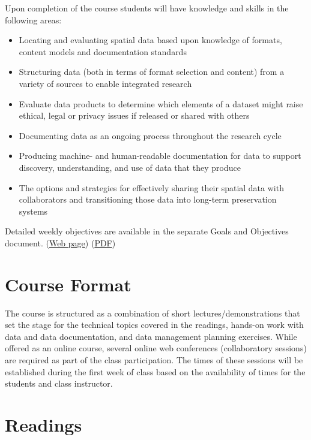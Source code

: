 \documentclass[
]{article}
\providecommand{\tightlist}{%
  \setlength{\itemsep}{0pt}\setlength{\parskip}{0pt}}
\begin{document}
Upon completion of the course students will have knowledge and skills in
the following areas:

\begin{itemize}
\tightlist
\item
  Locating and evaluating spatial data based upon knowledge of formats,
  content models and documentation standards
\item
  Structuring data (both in terms of format selection and content) from
  a variety of sources to enable integrated research
\item
  Evaluate data products to determine which elements of a dataset might
  raise ethical, legal or privacy issues if released or shared with
  others
\item
  Documenting data as an ongoing process throughout the research cycle
\item
  Producing machine- and human-readable documentation for data to
  support discovery, understanding, and use of data that they produce
\item
  The options and strategies for effectively sharing their spatial data
  with collaborators and transitioning those data into long-term
  preservation systems
\end{itemize}

Detailed weekly objectives are available in the separate Goals and
Objectives document.
(\href{http://karlbenedict.com/OILS515/goalsAndObjectives/goalsAndObjectives.html}{Web
page}) \textbar{}
(\href{http://karlbenedict.com/OILS515/goalsAndObjectives/goalsAndObjectives.pdf}{PDF})

\hypertarget{course-format}{%
\section{Course Format}\label{course-format}}

The course is structured as a combination of short
lectures/demonstrations that set the stage for the technical topics
covered in the readings, hands-on work with data and data documentation,
and data management planning exercises. While offered as an online
course, several online web conferences (collaboratory sessions) are
required as part of the class participation. The times of these sessions
will be established during the first week of class based on the
availability of times for the students and class instructor.

\hypertarget{readings}{%
\section{Readings}\label{readings}}
\end{document}
